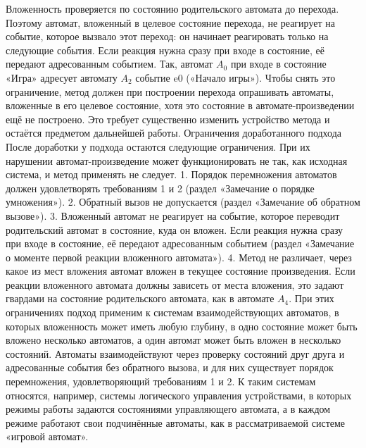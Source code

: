 \documentclass[12pt]{article}
\begin{document}
Вложенность проверяется по состоянию родительского автомата до перехода. Поэтому автомат, вложенный в целевое состояние перехода, не реагирует на событие, которое вызвало этот переход: он начинает реагировать только на следующие события. Если реакция нужна сразу при входе в состояние, её передают адресованным событием. Так, автомат $A_{0}$ при входе в состояние «Игра» адресует автомату $A_{2}$ событие e0 («Начало игры»). Чтобы снять это ограничение, метод должен при построении перехода опрашивать автоматы, вложенные в его целевое состояние, хотя это состояние в автомате-произведении ещё не построено. Это требует существенно изменить устройство метода и остаётся предметом дальнейшей работы.
Ограничения доработанного подхода
После доработки у подхода остаются следующие ограничения. При их нарушении автомат-произведение может функционировать не так, как исходная система, и метод применять не следует.
1. Порядок перемножения автоматов должен удовлетворять требованиям 1 и 2 (раздел «Замечание о порядке умножения»).
2. Обратный вызов не допускается (раздел «Замечание об обратном вызове»).
3. Вложенный автомат не реагирует на событие, которое переводит родительский автомат в состояние, куда он вложен. Если реакция нужна сразу при входе в состояние, её передают адресованным событием (раздел «Замечание о моменте первой реакции вложенного автомата»).
4. Метод не различает, через какое из мест вложения автомат вложен в текущее состояние произведения. Если реакции вложенного автомата должны зависеть от места вложения, это задают гвардами на состояние родительского автомата, как в автомате $A_{4}$.
При этих ограничениях подход применим к системам взаимодействующих автоматов, в которых вложенность может иметь любую глубину, в одно состояние может быть вложено несколько автоматов, а один автомат может быть вложен в несколько состояний. Автоматы взаимодействуют через проверку состояний друг друга и адресованные события без обратного вызова, и для них существует порядок перемножения, удовлетворяющий требованиям 1 и 2. К таким системам относятся, например, системы логического управления устройствами, в которых режимы работы задаются состояниями управляющего автомата, а в каждом режиме работают свои подчинённые автоматы, как в рассматриваемой системе «игровой автомат».
\end{document}
